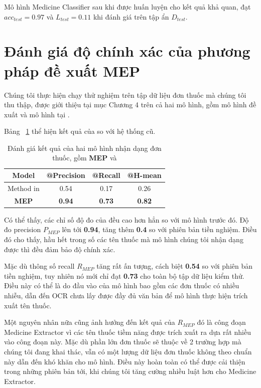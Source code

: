 Mô hình Medicine Classifier sau khi được huấn luyện cho kết quả khả quan, đạt $acc_{test} = 0.97$ và $L_{test} = 0.11$ khi đánh giá trên tập ẩn $D_{test}$.

\section{Đánh giá độ chính xác của phương pháp đề xuất MEP}

Chúng tôi thực hiện chạy thử nghiệm trên tập dữ liệu đơn thuốc mà chúng tôi thu thập, được giới thiệu tại mục Chương 4 trên cả hai mô hình, gồm mô hình đề xuất  và mô hình tại \cite{nguyen2021developing}.

Bảng ~\ref{exp:tab_1} thể hiện kết quả của  so với hệ thống cũ. 

\begin{table}
\centering
\caption{Đánh giá kết quả của hai mô hình nhận dạng đơn thuốc, gồm \textbf{MEP} và \cite{nguyen2021developing}}\label{exp:tab_1}
\begin{tabular}{|c|ccc|}
\hline
Model           & @Precision & @Recall & @H-mean  \\ 
\hline
Method in \cite{nguyen2021developing}      & 0.54       & 0.17    & 0.26     \\ 
\hline
\textbf{MEP} & \textbf{0.94}       & \textbf{0.73}    & \textbf{0.82}     \\
\hline
\end{tabular}
\end{table}

Có thể thấy, các chỉ số độ đo của  đều cao hơn hẳn so với mô hình trước đó. Độ đo precision $P_{MEP}$ lên tới \textbf{0.94}, tăng thêm \textbf{0.4} so với phiên bản tiền nghiệm. Điều đó cho thấy, hầu hết trong số các tên thuốc mà mô hình chúng tôi nhận dạng được thì đều đảm bảo độ chính xác. 

Mặc dù thông số recall $R_{MEP}$ tăng rất ấn tượng, cách biệt \textbf{0.54} so với phiên bản tiền nghiệm, tuy nhiên nó mới chỉ đạt \textbf{0.73} cho toàn bộ tập dữ liệu kiểm thử. Điều này có thể là do đầu vào của mô hình bao gồm các đơn thuốc có nhiều nhiễu, dẫn đến OCR chưa lấy được đầy đủ văn bản để mô hình thực hiện trích xuất tên thuốc.

Một nguyên nhân nữa cũng ảnh hưởng đến kết quả của $R_{MEP}$ đó là công đoạn Medicine Extractor vì các tên thuốc tiềm năng được trích xuất ra dựa rất nhiều vào công đoạn này. Mặc dù phần lớn đơn thuốc sẽ thuộc về 2 trường hợp mà chúng tôi đang khai thác, vẫn có một lượng dữ liệu đơn thuốc không theo chuẩn này dẫn đến khó khăn cho mô hình. Điều này hoàn toàn có thể được cải thiện trong những phiên bản tới, khi chúng tôi tăng cường nhiều luật hơn cho Medicine Extractor.


